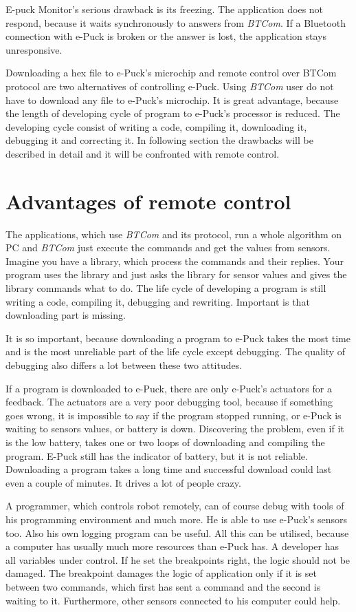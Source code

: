   E-puck Monitor's serious drawback is its freezing. The application does not respond, 
  because it waits synchronously to answers from {\it BTCom}.
  If a Bluetooth connection with e-Puck is broken or the answer is lost, the application stays unresponsive.
   
  Downloading a hex file to e-Puck's microchip and remote control over BTCom protocol are two alternatives
  of controlling e-Puck.
  Using {\it BTCom} user do not have to download any file to e-Puck's microchip.
  It is great advantage, because the length of developing cycle of program to e-Puck's processor is reduced.
  The developing cycle consist of	writing a code, compiling it, downloading it, debugging it and correcting it.
  In following section the drawbacks will be described in detail and it will be confronted with
  remote control.
\section{Advantages of remote control} \label{sec:remote}
  The applications, which use {\it BTCom} and its protocol, run a whole algorithm on PC and {\it BTCom} just 
  execute the commands and get the values from sensors. Imagine you have a library, which process the commands
  and their replies. Your program uses the library and just asks the library for sensor values and
  gives the library commands what to do. The life cycle of developing a program is still writing a code, 
  compiling it, debugging and rewriting. Important is that downloading part is missing.
   
  It is so important, because downloading a program to e-Puck takes the most time and is the most 
  unreliable part of the life cycle except debugging.
  The quality of debugging also differs a lot between these two attitudes.
   
  If a program is downloaded to e-Puck, there are only e-Puck's actuators for a feedback.
  The actuators are a very poor debugging tool, because if something goes wrong, 
  it is impossible to say if the program stopped running,
  or e-Puck is waiting to sensors values, or battery is down. 
  Discovering the problem, even if it is the low battery, takes one or two loops of downloading and compiling the program.
  E-Puck still has the indicator of battery, but it is not reliable.
  Downloading a program takes a long time and successful download could last even a couple of minutes. 
  It drives a lot of people crazy.
   
  A programmer, which controls robot remotely, can of course debug with tools of his programming environment and much more.
  He is able to use e-Puck's sensors too. Also his own logging program can be useful. 
  All this can be utilised, because a computer has usually much more resources than e-Puck has.
  A developer has all variables under control. If he set the breakpoints
  right, the logic should not be damaged. 
  The breakpoint damages the logic of application only if it is set between two commands,
  which first has sent a command and the second is waiting to it.
  Furthermore, other sensors connected to his computer could help.
  
